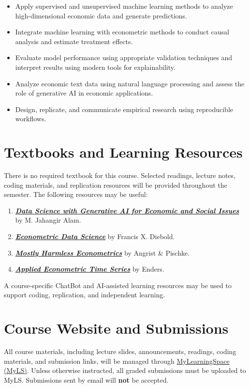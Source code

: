 \documentclass[11pt]{article}
\newcommand{\coloredsection}[1]{%
    \section*{\large\textcolor{sectioncolor}{#1}}%
}
\begin{document}
\begin{itemize}
\item Apply supervised and unsupervised machine learning methods to analyze high-dimensional economic data and generate predictions.
\item Integrate machine learning with econometric methods to conduct causal analysis and estimate treatment effects.
\item Evaluate model performance using appropriate validation techniques and interpret results using modern tools for explainability.
\item Analyze economic text data using natural language processing and assess the role of generative AI in economic applications.
\item Design, replicate, and communicate empirical research using reproducible workflows.
\end{itemize}



\coloredsection{Textbooks and Learning Resources}

There is no required textbook for this course. Selected readings, lecture notes, coding materials, and replication resources will be provided throughout the semester. The following resources may be useful:

\begin{enumerate}
    \item \href{https://www.aieconlab.org/}{\textit{\textbf{Data Science with Generative AI for Economic and Social Issues}}} by M. Jahangir Alam.
    \item \href{https://www.sas.upenn.edu/~fdiebold/Teaching104/Econometrics.pdf}{\textit{\textbf{Econometric Data Science}}} by Francis X. Diebold.
    \item \href{https://press.princeton.edu/books/paperback/9780691120355/mostly-harmless-econometrics}{\textit{\textbf{Mostly Harmless Econometrics}}} by Angrist \& Pischke.
    \item \href{https://www.wiley.com/en-us/Applied+Econometric+Time+Series\%2C+4th+Edition-p-9781118808566}{\textit{\textbf{Applied Econometric Time Series}}} by Enders.
\end{enumerate}

A course-specific ChatBot and AI-assisted learning resources may be used to support coding, replication, and independent learning.

\coloredsection{Course Website and Submissions}

All course materials, including lecture slides, announcements, readings, coding materials, and submission links, will be managed through \href{https://mylearningspace.wlu.ca}{MyLearningSpace (MyLS)}. Unless otherwise instructed, all graded submissions must be uploaded to MyLS. Submissions sent by email will \textbf{not} be accepted.
\end{document}
